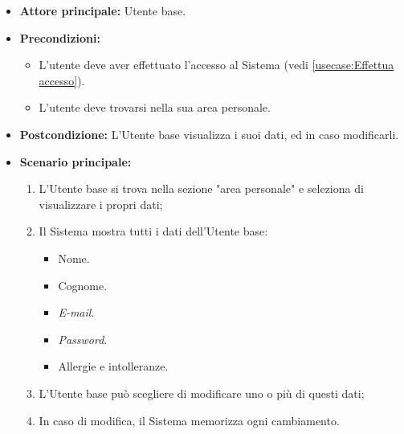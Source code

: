 \label{usecase:Visualizzazione e modifica dati utente}
\begin{itemize}
	\item \textbf{Attore principale:} Utente base.

	\item \textbf{Precondizioni:}
	\begin{itemize}
        \item L'utente deve aver effettuato l'accesso al Sistema (vedi \autoref{usecase:Effettua accesso}).
        \item L'utente deve trovarsi nella sua area personale.
    \end{itemize}

	\item \textbf{Postcondizione:} L'Utente base visualizza i suoi dati, ed in caso modificarli.

	\item \textbf{Scenario principale:}
	      \begin{enumerate}
		      \item L'Utente base si trova nella sezione "area personale" e seleziona di visualizzare i propri dati;
		      \item Il Sistema mostra tutti i dati dell'Utente base:
              \begin{itemize}
                \item Nome.
                \item Cognome.
                \item \textit{E-mail}.
                \item \textit{Password}.
                \item Allergie e intolleranze.
              \end{itemize}
              \item L'Utente base può scegliere di modificare uno o più di questi dati;
              \item In caso di modifica, il Sistema memorizza ogni cambiamento.
	      \end{enumerate}
\end{itemize}
